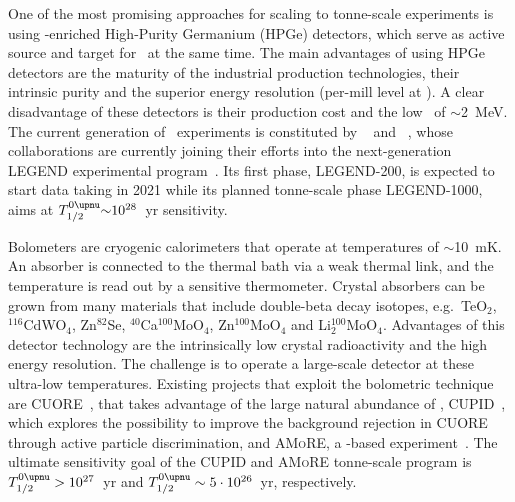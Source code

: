 \begin{description}[wide]

  \item[Semiconductors] One of the most promising approaches for scaling to tonne-scale
    experiments is using \gesix-enriched High-Purity Germanium (HPGe) detectors, which
    serve as active source and target for \onbb\ at the same time. The main advantages of
    using HPGe detectors are the maturity of the industrial production technologies, their
    intrinsic purity and the superior energy resolution (per-mill level at \qbb).  A clear
    disadvantage of these detectors is their production cost and the low \qbb\ of
    $\sim$2~MeV. The current generation of \gesix\ experiments is constituted by
    \gerda~\cite{Budjas2013} and \majoranademo~\cite{Abgrall2014}, whose collaborations
    are currently joining their efforts into the next-generation LEGEND experimental
    program~\cite{Abgrall2017}. Its first phase, LEGEND-200, is expected to start data
    taking in 2021 while its planned tonne-scale phase LEGEND-1000, aims at $\thalfzeroM
    {\sim}10^{28}$~yr sensitivity.

  \item[Bolometers] Bolometers are cryogenic calorimeters that operate at temperatures of
    $\sim$10~mK. An absorber is connected to the thermal bath via a weak thermal link, and
    the temperature is read out by a sensitive thermometer. Crystal absorbers can be grown
    from many materials that include double-beta decay isotopes, e.g.~TeO$_2$,
    $^{116}$CdWO$_4$, Zn$^{82}$Se, $^{40}$Ca$^{100}$MoO$_4$, Zn$^{100}$MoO$_4$ and
    Li$_2^{100}$MoO$_4$.  Advantages of this detector technology are the intrinsically low
    crystal radioactivity and the high energy resolution. The challenge is to operate a
    large-scale detector at these ultra-low temperatures. Existing projects that exploit
    the bolometric technique are CUORE~\cite{Arnaboldi2002, Artusa2014}, that takes
    advantage of the large natural abundance of , CUPID~\cite{Wang2015}, which
    explores the possibility to improve the background rejection in CUORE through active
    particle discrimination, and \textsc{AMoRE}, a -based
    experiment~\cite{Kim2015}. The ultimate sensitivity goal of the CUPID and
    \textsc{AMoRE} tonne-scale program is $\thalfzeroM > 10^{27}$~yr and $\thalfzeroM
    \sim 5 \cdot 10^{26}$~yr, respectively.


\end{description}
